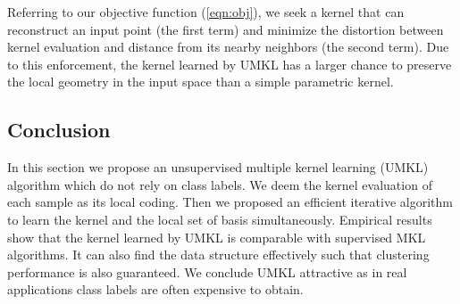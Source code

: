 Referring to our objective function (\ref{eqn:obj}), we seek a kernel that can reconstruct an input point (the first term) and minimize the distortion between kernel evaluation and distance from its nearby neighbors (the second term). Due to this enforcement, the kernel learned by UMKL has a larger chance to preserve the local geometry in the input space than a simple parametric kernel.

\subsection{Conclusion}\label{sec:con}

In this section we propose an unsupervised multiple kernel learning (UMKL) algorithm which do not rely on class labels. We deem the kernel evaluation of each sample as its local coding. Then we proposed an efficient iterative algorithm to learn the kernel and the local set of basis simultaneously. Empirical results show that the kernel learned by UMKL is comparable with supervised MKL algorithms. It can also find the data structure effectively such that clustering performance is also guaranteed. We conclude UMKL attractive as in real applications class labels are often expensive to obtain. 